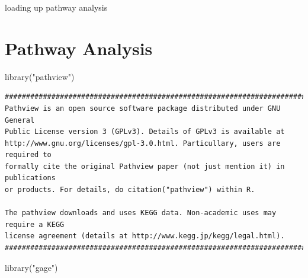 \documentclass[
  letterpaper,
  DIV=11,
  numbers=noendperiod]{scrartcl}
\newenvironment{Shaded}{\begin{snugshade}}{\end{snugshade}}
\newcommand{\FunctionTok}[1]{\textcolor[rgb]{0.28,0.35,0.67}{#1}}
\newcommand{\NormalTok}[1]{\textcolor[rgb]{0.00,0.23,0.31}{#1}}
\newcommand{\OtherTok}[1]{\textcolor[rgb]{0.00,0.23,0.31}{#1}}
\newcommand{\SpecialCharTok}[1]{\textcolor[rgb]{0.37,0.37,0.37}{#1}}
\newcommand{\StringTok}[1]{\textcolor[rgb]{0.13,0.47,0.30}{#1}}
\begin{document}
loading up pathway analysis

\hypertarget{pathway-analysis}{%
\section{Pathway Analysis}\label{pathway-analysis}}

\begin{Shaded}
\begin{Highlighting}[]
\FunctionTok{library}\NormalTok{(}\StringTok{"pathview"}\NormalTok{)}
\end{Highlighting}
\end{Shaded}

\begin{verbatim}
##############################################################################
Pathview is an open source software package distributed under GNU General
Public License version 3 (GPLv3). Details of GPLv3 is available at
http://www.gnu.org/licenses/gpl-3.0.html. Particullary, users are required to
formally cite the original Pathview paper (not just mention it) in publications
or products. For details, do citation("pathview") within R.

The pathview downloads and uses KEGG data. Non-academic uses may require a KEGG
license agreement (details at http://www.kegg.jp/kegg/legal.html).
##############################################################################
\end{verbatim}

\begin{Shaded}
\begin{Highlighting}[]
\FunctionTok{library}\NormalTok{(}\StringTok{"gage"}\NormalTok{)}
\end{Highlighting}
\end{Shaded}

\begin{verbatim}
\end{verbatim}

\begin{Shaded}
\end{Shaded}
\end{document}
